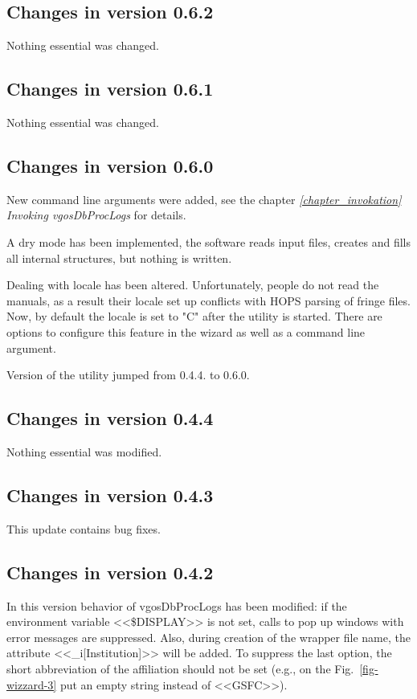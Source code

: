 \documentclass [10pt,letterpaper]{report}
\begin{document}
\subsection{Changes in version 0.6.2}
Nothing essential was changed.


\subsection{Changes in version 0.6.1}
Nothing essential was changed.


\subsection{Changes in version 0.6.0}
New command line arguments were added, see the chapter
\emph{\ref{chapter_invokation} Invoking vgosDbProcLogs} for details.

A dry mode has been implemented, the software reads input files, creates and fills
all internal structures, but nothing is written.

Dealing with locale has been altered. Unfortunately, people do not read the manuals,
as a result their locale set up conflicts with HOPS parsing of fringe files. Now,
by default the locale is set to "C" after the utility is started. There are options
to configure this feature in the wizard as well as a command line argument.

Version of the utility jumped from 0.4.4. to 0.6.0.

\subsection{Changes in version 0.4.4}
Nothing essential was modified.

\subsection{Changes in version 0.4.3}
This update contains bug fixes.

\subsection{Changes in version 0.4.2}
In this version behavior of vgosDbProcLogs has been modified: if the environment
variable <<\$DISPLAY>> is not set, calls to pop up windows with error messages are
suppressed. Also, during creation of the wrapper file name, the attribute
<<\_i[Institution]>> will be added. To suppress the last option, the short
abbreviation of the affiliation should not be set (e.g., on the Fig.~\ref{fig-wizzard-3}
put an empty string instead of <<GSFC>>).
\end{document}
